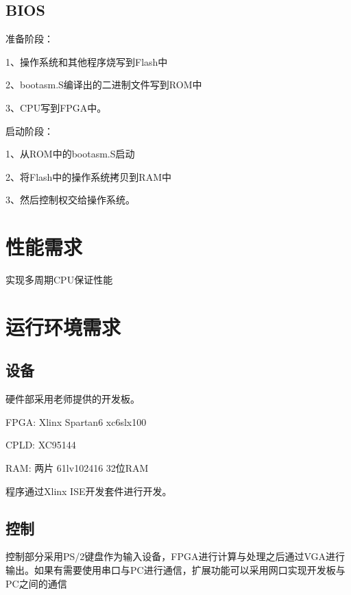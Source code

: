 \documentclass[12pt,a4paper]{article}
\begin{document}
\begin{CJK}{UTF8}{gbsn}
	\subsection{BIOS}
		\begin{description*}
			\setlength{\itemsep}{1pt}
			\item[\quad 准备阶段：]\hfill\par
				1、操作系统和其他程序烧写到Flash中\par
				2、bootasm.S编译出的二进制文件写到ROM中\par
				3、CPU写到FPGA中。
			\item[\quad 启动阶段：]\hfill\par
				1、从ROM中的bootasm.S启动\par
				2、将Flash中的操作系统拷贝到RAM中\par
				3、然后控制权交给操作系统。
		\end{description*}

\section{性能需求}
	实现多周期CPU保证性能
\section{运行环境需求}
	\subsection{设备}
		硬件部采用老师提供的开发板。\par
		FPGA: Xlinx Spartan6 xc6slx100\par
		CPLD: XC95144\par
		RAM: 两片 61lv102416 32位RAM \par
		程序通过Xlinx ISE开发套件进行开发。

	\subsection{控制}
		控制部分采用PS/2键盘作为输入设备，FPGA进行计算与处理之后通过VGA进行输出。如果有需要使用串口与PC进行通信，扩展功能可以采用网口实现开发板与PC之间的通信
\newpage
\end{CJK}
\end{document}
